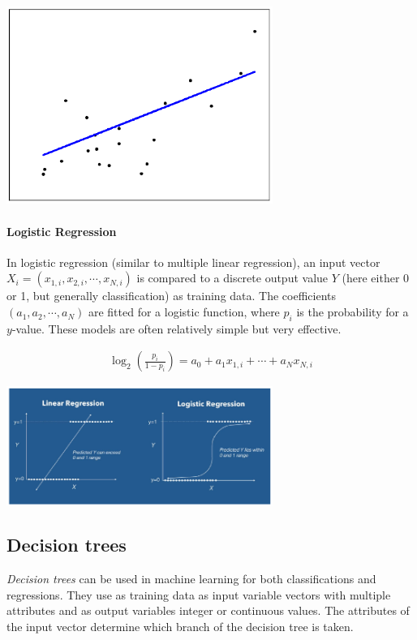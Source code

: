 \begin{center}\includegraphics[width=0.65\textwidth]{img/machine/MachineLinearRegression.png}\end{center}

\paragraph{Logistic Regression}
In logistic regression (similar to multiple linear regression), an input vector $X_i=(x_{1,i}, x_{2,i},\cdots,x_{N,i})$ is compared to a discrete output value $Y$ (here either 0 or 1, but generally classification) as training data. The coefficients $(a_1,a_2,\cdots,a_N)$ are fitted for a logistic function, where $p_i$ is the probability for a $y$-value. These models are often relatively simple but very effective.

\begin{align}
    \log_{2}\left(\frac{p_i}{1-p_i}\right)=a_0+a_1x_{1,i}+\cdots+a_Nx_{N,i}
\end{align}

\begin{center}\includegraphics[width=0.65\textwidth]{img/machine/MachineLogisticRegression.png}\end{center}

\subsection{Decision trees}

\emph{Decision trees} can be used in machine learning for both classifications and regressions. They use as training data as input variable vectors with multiple attributes and as output variables integer or continuous values. The attributes of the input vector determine which branch of the decision tree is taken.

